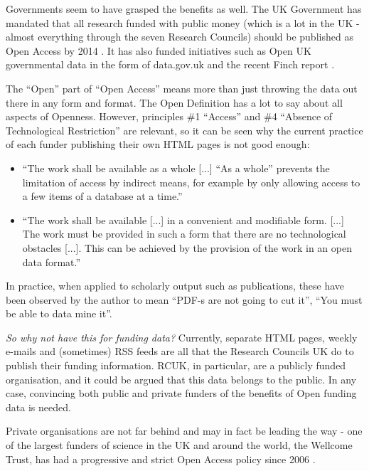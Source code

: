Governments seem to have grasped the benefits as well. The UK Government has mandated that all research funded with public money (which is a lot in the UK - almost everything through the seven Research Councils) should be published as Open Access by 2014 \cite{guardian-ukgov-oa2014}. It has also funded initiatives such as Open UK governmental data in the form of data.gov.uk \cite{open-uk-gov-data} and the recent Finch report \cite{guardian-finch} \cite{finch}.

The ``Open'' part of ``Open Access'' means more than just throwing the data out there in any form and format. The Open Definition \cite{od} has a lot to say about all aspects of Openness. However, principles \#1 ``Access'' and \#4 ``Absence of Technological Restriction'' are relevant, so it can be seen why the current practice of each funder publishing their own HTML pages is not good enough:

\begin{itemize}
 \item ``The work shall be available as a whole [...] ``As a whole'' prevents the limitation of access by indirect means, for example by only allowing access to a few items of a database at a time.''
 \item ``The work shall be available [...] in a convenient and modifiable form. [...] The work must be provided in such a form that there are no technological obstacles [...]. This can be achieved by the provision of the work in an open data format.''
\end{itemize}

In practice, when applied to scholarly output such as publications, these have been observed by the author to mean ``PDF-s are not going to cut it'', ``You must be able to data mine it''.

\emph{So why not have this for funding data?} Currently, separate HTML pages, weekly e-mails and (sometimes) RSS feeds are all that the Research Councils UK do to publish their funding information. RCUK, in particular, are a publicly funded organisation, and it could be argued that this data belongs to the public. In any case, convincing both public and private funders of the benefits of Open funding data is needed.

Private organisations are not far behind and may in fact be leading the way - one of the largest funders of science in the UK and around the world, the Wellcome Trust, has had a progressive and strict Open Access policy since 2006 \cite{wellcome-oa}.

